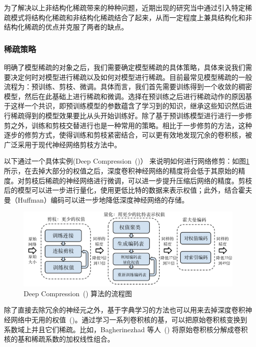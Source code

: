 为了解决以上非结构化稀疏带来的种种问题，近期出现的研究当中通过引入特定稀疏模式将结构化稀疏和非结构化稀疏结合了起来，从而一定程度上兼具结构化和非结构化稀疏的优点并克服了两者的缺点。

\subsubsection{稀疏策略}
明确了模型稀疏的对象之后，我们需要确定模型稀疏的具体策略，具体来说我们需要决定何时对模型进行稀疏以及如何对模型进行稀疏。目前最常见模型稀疏的一般流程为：预训练、剪枝、微调。具体而言，我们首先需要训练得到一个收敛的稠密模型，然后在此基础上进行稀疏和微调。选择在预训练之后进行稀疏动作的原因基于这样一个共识，即预训练模型的参数蕴含了学习到的知识，继承这些知识然后进行稀疏得到的模型效果要比从头开始训练好。除了基于预训练模型进行进行一步修剪之外，训练和剪枝交替进行也是一种常用的策略。相比于一步修剪的方法，这种逐步的修剪方式，使得训练和剪枝紧密结合，可以更有效地发现冗余的卷积核，被广泛采用于现代神经网络剪枝方法中。

以下通过一个具体实例(Deep Compression~(\cite{han2015deep})） 来说明如何进行网络修剪：如图\ref{fig:ch09/ch09-deepcomp}所示，在去掉大部分的权值之后，深度卷积神经网络的精度将会低于其原始的精度。对剪枝后稀疏的神经网络进行微调，可以进一步提升压缩后网络的精度。剪枝后的模型可以进一步进行量化，使用更低比特的数据来表示权值；此外，结合霍夫曼（Huffman）编码可以进一步地降低深度神经网络的存储。

\begin{figure}[h]
\centering
\includegraphics[scale=0.6]{figs/ch09/ch09-deepcomp.png}
\caption{Deep Compression~(\cite{han2015deep}) 算法的流程图}
\label{fig:ch09/ch09-deepcomp}
\end{figure}

除了直接去除冗余的神经元之外，基于字典学习的方法也可以用来去掉深度卷积神经网络中无用的权值~(\cite{bagherinezhad2017lcnn})。通过学习一系列卷积核的基，可以把原始卷积核变换到系数域上并且它们稀疏。比如，Bagherinezhad 等人~(\cite{bagherinezhad2017lcnn}) 将原始卷积核分解成卷积核的基和稀疏系数的加权线性组合。

